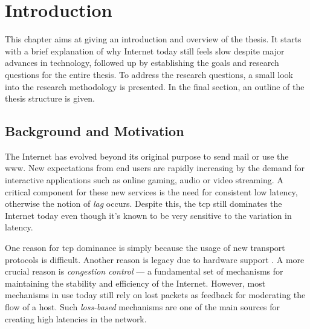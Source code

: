 \chapter{Introduction}

This chapter aims at giving an introduction and overview of the thesis. It starts with a brief explanation of why Internet today still feels slow despite major advances in technology, followed up by establishing the goals and research questions for the entire thesis. To address the research questions, a small look into the research methodology is presented. In the final section, an outline of the thesis structure is given.





\section{Background and Motivation}

The Internet has evolved beyond its original purpose to send mail or use the \gls{www}. New expectations from end users are rapidly increasing by the demand for interactive applications such as online gaming, audio or video streaming. A critical component for these new services is the need for consistent low latency, otherwise the notion of \textit{lag} occurs. Despite this, the \gls{tcp} still dominates the Internet today even though it's known to be very sensitive to the variation in latency.



One reason for \gls{tcp} dominance is simply because the usage of new transport protocols is difficult. Another reason is legacy due to hardware support . A more crucial reason is \textit{congestion control} --- a fundamental set of mechanisms for maintaining the stability and efficiency of the Internet. \cite{rfc6077} However, most mechanisms in use today still rely on lost packets as feedback for moderating the flow of a host. Such \textit{loss-based} mechanisms are one of the main sources for creating high latencies in the network.

